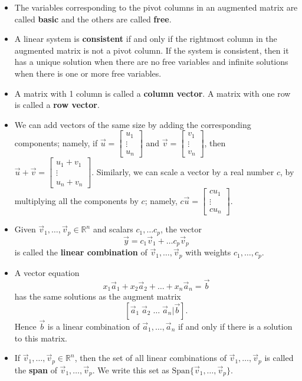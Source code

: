 \begin{itemize}
\begin{enumerate}
\item Beginning with rightmost pivot and working upwards and to the left, create 0's above each pivot. Scale pivot positions entries to be 1.
\end{enumerate}
\item The variables corresponding to the pivot columns in an augmented matrix are called {\bf basic} and the others are called {\bf free}.
\item A linear system is \textbf{consistent} if and only if the rightmost column in the augmented matrix is not a pivot column. If the system is consistent, then it has a unique solution when there are no free variables and infinite solutions when there is one or more free variables.
\item A matrix with 1 column is called a {\bf column vector}. A matrix with one row is called a {\bf row vector}.
\item We can add vectors of the same size by adding the corresponding components; namely,
if $\vec{u}=\begin{bmatrix} u_1\\ \vdots\\ u_n \end{bmatrix}$ and  $\vec{v}=\begin{bmatrix} v_1\\ \vdots\\ v_n \end{bmatrix}$, then $\vec{u}+\vec{v} =\begin{bmatrix} u_1+v_1\\ \vdots\\ u_n+v_n \end{bmatrix}$. Similarly, we can scale a vector by a real number $c$, by multiplying all the components by $c$; namely, $c\vec{u}=\begin{bmatrix} cu_1\\ \vdots\\ cu_n \end{bmatrix}$.
\item Given $\vec{v}_1,\dots, \vec{v}_p \in \mathbb{R}^n$ and scalars $c_1, \dots c_p$, the vector $$\vec{y} = c_1 \vec{v}_1 +\dots c_p \vec{v}_p$$ is called the {\bf linear combination} of $\vec{v}_1,\dots, \vec{v}_p$ with weights $c_1,\dots,c_p$.
\item A vector equation $$x_1 \vec{a}_1 + x_2 \vec{a}_2 +\dots + x_n \vec{a}_n =\vec{b}$$ has the same solutions as the augment matrix $$[\vec{a}_1 \; \vec{a}_2 \; \dots \; \vec{a}_n \Big| \vec{b}].$$ Hence $\vec{b}$ is a linear combination of $\vec{a}_1, \dots, \vec{a}_n$ if and only if there is a solution to this matrix.
\item If $\vec{v}_1, \dots, \vec{v}_p \in \mathbb{R}^n$, then the set of all linear combinations of $\vec{v}_1, \dots, \vec{v}_p$ is called the {\bf span} of $\vec{v}_1, \dots, \vec{v}_p$. We write this set as $\text{Span} \{\vec{v}_1, \dots, \vec{v}_p\}$.
\end{itemize}

